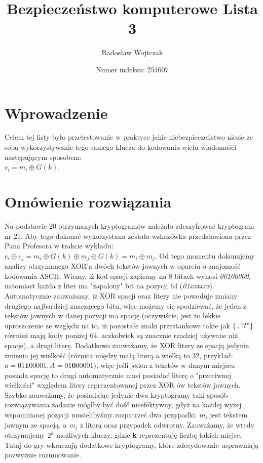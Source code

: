 \documentclass[a4paper,14pt]{report}
\title{Bezpieczeństwo komputerowe Lista 3}
\author{Radosław Wojtczak}
\date{Numer indeksu: 254607}
\begin{document}
\maketitle
\section{Wprowadzenie}
	Celem tej listy było przetestowanie w praktyce jakie niebezpieczeństwo niesie ze sobą wykorzystywanie tego samego klucza do kodowania wielu wiadomości następującym sposobem: \\
	$c_{i}=m_{i} \oplus G(k)$.
\section{Omówienie rozwiązania}
	Na podstawie 20 otrzymanych kryptogramów należało zdeszyfrować kryptogram nr 21. Aby tego dokonać wykorzystana została wskazówka przedstawiona przez Pana Profesora w trakcie wykładu:\\ 
	$c_{i} \oplus c_{j} = m_{i} \oplus G(k) \oplus m_{j} \oplus G(k) = m_{i} \oplus m_{j} $. Od tego momentu dokonujemy analizy otrzymanego XOR'a dwóch tekstów jawnych w oparciu o znajomość kodowania ASCII. Wiemy, iż kod spacji zapisany na 8 bitach wynosi \textit{00100000}, natomiast każda z liter ma "zapalony" bit na pozycji 64 (\textit{01xxxxxx}). Automatycznie zauważamy, iż XOR spacji oraz litery nie powoduje zmiany drugiego najbardziej znaczącego bitu, więc możemy się spodziewać, że jeden z tekstów jawnych w danej pozycji ma spację (oczywiście, jest to lekkie uproszczenie ze względu na to, iż pozostałe znaki przestankowe takie jak $\{. , ! ? "\}$ również mają kody poniżej 64, aczkolwiek są znacznie rzadziej używane niż spacje), a drugi literę. Dodatkowo zauważamy, że XOR litery ze spacją jedynie zmienia jej wielkość (różnica między małą literą a wielką to 32, przykład: $a=01\textbf{1}00001, A=01\textbf{0}00001)$, więc jeśli jeden z tekstów w danym miejscu posiada spację to drugi automatycznie musi posiadać literę o "przeciwnej wielkości" względem litery reprezentowanej przez XOR ów tekstów jawnych. \\
	Szybko zauważamy, że posiadając jedynie dwa kryptogramy taki sposób rozwiązywania zadanie mógłby być dość nieefektywny, gdyż na każdej wyżej wspomnianej pozycji musielibyśmy rozpatrzeć dwa przypadki: $m_{i}$ jest tekstem jawnym ze spacją, a $m_{j}$ z literą oraz przypadek odwrotny. Zauważamy, że wtedy otrzymujemy $2^{k}$ możliwych kluczy, gdzie \textbf{k} reprezentuję liczbę takich miejsc. Tutaj do gry wkraczają dodatkowe kryptogramy, które zdecydowanie usprawniają pozwyższe rozumowanie. \\
\end{document}
